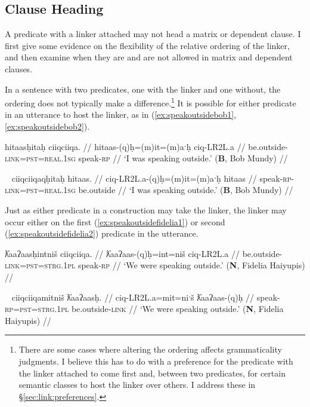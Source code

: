 \subsection{Clause Heading} \label{sec:link:clause}

A predicate with a linker attached may not head a matrix or dependent clause. I first give some evidence on the flexibility of the relative ordering of the linker, and then examine when they are and are not allowed in matrix and dependent clauses.

In a sentence with two predicates, one with the linker and one without, the ordering does not typically make a difference.\footnote{There are some cases where altering the ordering affects grammaticality judgments. I believe this has to do with a preference for the predicate with the linker attached to come first and, between two predicates, for certain semantic classes to host the linker over others. I address these in \S\ref{sec:link:preferences}.} It is possible for either predicate in an utterance to host the linker, as in (\ref{ex:speakoutsidebob1}, \ref{ex:speakoutsidebob2}).

\ex \label{ex:speakoutsidebob1}
\begingl
\glpreamble hitaasḥitaḥ ciiqciiqa. //
\gla hitaas-(q)ḥ=(m)it=(m)aˑḥ ciq-LR2L.a //
\glb be.outside-\textsc{link}=\textsc{pst}=\textsc{real.1sg} speak-\textsc{rp} //
\glft `I was speaking outside.' (\textbf{B}, Bob Mundy) //
\endgl
\xe

\ex~ \label{ex:speakoutsidebob2}
\begingl
\glpreamble ciiqciiqaqḥitaḥ hitaas. //
\gla ciq-LR2L.a-(q)ḥ=(m)it=(m)aˑḥ  hitaas  //
\glb speak-\textsc{rp}-\textsc{link}=\textsc{pst}=\textsc{real.1sg} be.outside //
\glft `I was speaking outside.' (\textbf{B}, Bob Mundy) //
\endgl
\xe

Just as either predicate in a construction may take the linker, the linker may occur either on the first (\ref{ex:speakoutsidefidelia1}) or second (\ref{ex:speakoutsidefidelia2}) predicate in the utterance.

\ex \label{ex:speakoutsidefidelia1}
\begingl
\glpreamble ƛ̓aaʔaasḥintniš ciiqciiqa. //
\gla ƛ̓aaʔaas-(q)ḥ=int=niš ciq-LR2L.a //
\glb be.outside-\textsc{link}=\textsc{pst}=\textsc{strg.1pl} speak-\textsc{rp} //
\glft `We were speaking outside.' (\textbf{N}, Fidelia Haiyupis) //
\endgl
\xe

\ex~ \label{ex:speakoutsidefidelia2}
\begingl
\glpreamble ciiqciiqamitniš ƛ̓aaʔaasḥ. //
\gla ciq-LR2L.a=mit=niˑš ƛ̓aaʔaas-(q)ḥ //
\glb speak-\textsc{rp}=\textsc{pst}=\textsc{strg.1pl} be.outside-\textsc{link} //
\glft `We were speaking outside.' (\textbf{N}, Fidelia Haiyupis) //
\endgl
\xe

